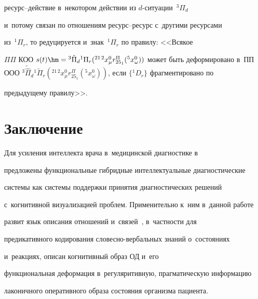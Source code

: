 ре\-сурс--дей\-ст\-вие в~некотором действии из $d$-си\-ту\-ации~${}^3\Pi_d$ 

и~потому связан по отношениям ре\-сурс--ре\-сурс с~другими ресурсами 

из~${}^1\Pi_r$, то редуцируется и~знак~${}^1\Pi_r$ по правилу: <<Всякое 

$\Pi\Pi$ КОО $s(t)\hm = {}^3\hat{\Pi}_d{}^1\Pi_r({}^{21\,2}x^0_\mu 

r_{25_1}^{\Pi}({}^5 x^0_\omega))$ может быть деформировано в~ПП ООО ${}^3 

\tilde{\hat{\Pi}}_d{}^1\tilde{\Pi}_r ({}^{21\,2}x^0_\mu 

r_{25_1}^{\Pi}({}^5x^0_\omega))$, если $\{{}^1D_r\}$ фрагментировано по 

предыдущему правилу>>.



\vspace*{-3pt}

  

\section{Заключение}



\vspace*{-1pt}



  Для усиления интеллекта врача в~медицинской диагностике в~\cite{10-rum} 

предложены функциональные гибридные интеллектуальные диагностические 

системы как системы поддержки принятия диагностических решений 

с~когнитивной визуализацией проблем. Применительно к~ним в~данной работе 

развит язык описания отношений и~связей~\cite{4-rum}, в~част\-ности для 

предикативного кодирования сло\-вес\-но-вер\-баль\-ных знаний о~состояниях 

и~реакциях, описан когнитивный образ ОД и~его 

функциональная деформация в~регуляритивную, прагматическую информацию 

лаконичного оперативного образа состояния организма пациента.



\vspace*{-3pt}

  

